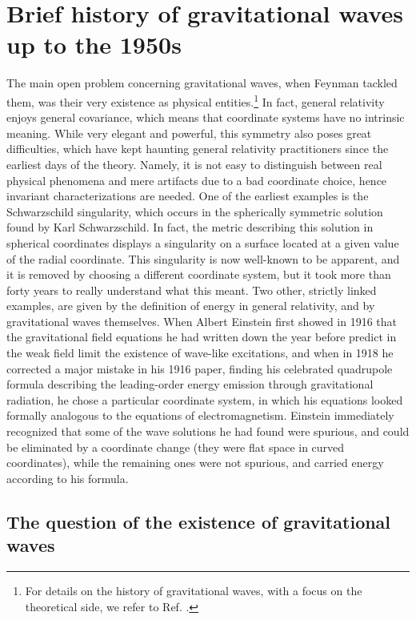 \documentclass{ws-procs961x669}            %
\begin{document}
\section{Brief history of gravitational waves up to the 1950s}\label{History}


The main open problem concerning gravitational waves, when Feynman
tackled them, was their very existence as physical
entities.\footnote{For details on the history of gravitational
waves, with a focus on the theoretical side, we refer to Ref.
.} In fact, general relativity enjoys
general covariance, which means that coordinate systems have no
intrinsic meaning. While very elegant and powerful, this symmetry
also poses great difficulties, which have kept haunting general
relativity practitioners since the earliest days of the theory.
Namely, it is not easy to distinguish between real physical
phenomena and mere artifacts due to a bad coordinate choice, hence
invariant characterizations are needed. One of the earliest
examples is the Schwarzschild
singularity\cite{Schwarzschild:1916uq}, which occurs in the
spherically symmetric solution found by Karl Schwarzschild. In
fact, the metric describing this solution in spherical coordinates
displays a singularity on a surface located at a given value of
the radial coordinate. This singularity is now well-known to be
apparent, and it is removed by choosing a different coordinate
system\cite{Kruskal:1959vx}, but it took more than forty years to
really understand what this meant. Two other, strictly linked
examples, are given by the definition of energy in general
relativity, and by gravitational waves themselves. When Albert
Einstein first showed in 1916\cite{Einstein:1916cc} that the
gravitational field equations he had written down the year
before\cite{Einstein:1915ca} predict in the weak field limit the
existence of wave-like excitations, and when in
1918\cite{Einstein:1918btx} he corrected a major mistake in his
1916 paper, finding his celebrated quadrupole formula describing
the leading-order energy emission through gravitational radiation,
he chose a particular coordinate system, in which his equations
looked formally analogous to the equations of electromagnetism.
Einstein immediately recognized that some of the wave solutions he
had found were spurious, and could be eliminated by a coordinate
change (they were flat space in curved coordinates), while the
remaining ones were not spurious, and carried energy according to
his formula.


\subsection{The question of the existence of gravitational waves}
\end{document}
